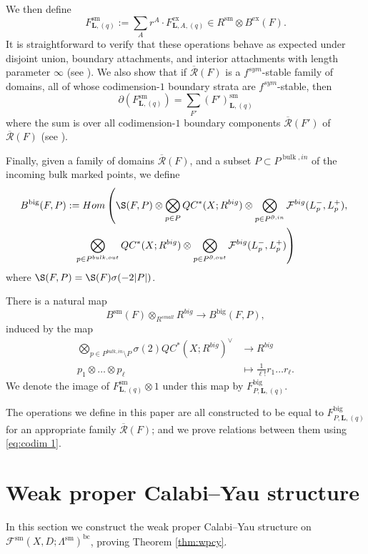 \documentclass{article}
\def\fuk{\EuF}
\def\bc{\mathsf{bc}}
\def\nov{r}
\def\cF{\mathcal{F}}
\def\fuk{\mathcal{F}}
\def\bc{{\operatorname{bc}}}
\def\Rbar{\overline{\mathcal{R}}}
\def\big{{\operatorname{big}}}
\def\sm{{\operatorname{sm}}}
\def\bL{\mathbf{L}}
\def\ex{\mathrm{ex}}
\def\bulk{{\operatorname{bulk}}}
\def\novb{r}
\begin{document}
We then define
$$F^\sm_{\bL,(q)} := \sum_A \nov^A \cdot F^\ex_{\bL,A,(q)} \in R^\sm \otimes B^\ex(F).$$
It is straightforward to verify that these operations behave as expected under disjoint union, boundary attachments, and interior attachments with length parameter $\infty$ (see \cite[Lemmas 4.16, 4.17]{relfukii}).  
We also show that if $\Rbar(F)$ is a $f^{sym}$-stable family of domains, all of whose codimension-$1$ boundary strata are $f^{sym}$-stable, then 
\begin{equation}\label{eq:codim 1}\partial(F^\sm_{\bL,(q)}) = \sum_{F'} (F')^\sm_{\bL,(q)}
\end{equation}
where the sum is over all codimension-$1$ boundary components $\Rbar(F')$ of $\Rbar(F)$ (see \cite[Lemma 4.18]{relfukii}). 

Finally, given a family of domains $\Rbar(F)$, and a subset $P \subset P^{\bulk,in}$ of the incoming bulk marked points, we define 
\begin{multline}
B^\big(F,P) := Hom\left(\S(F,P) \otimes \bigotimes_{p \in P} QC^*(X;R^{big}) \otimes \bigotimes_{p \in P^{\partial,in}} \cF^{big}(L_p^-,L_p^+) ,\right.\\
\left.\bigotimes_{p \in P^{bulk,out}} QC^*(X;R^{big}) \otimes  \bigotimes_{p \in P^{\partial,out}} \cF^{big}(L_p^-,L_p^+)\right)
 \end{multline}
 where $\S(F,P) = \S(F)\sigma(-2|P|)$. 
 
There is a natural map
$$B^\sm(F) \otimes_{R^{small}} R^{big} \to B^\big(F,P),$$
induced by the map
\begin{align*}
    \bigotimes_{p \in P^{bulk,in} \setminus P} \sigma(2)QC^*(X;R^{big})^\vee & \to R^{big} \\
    p_1 \otimes \ldots \otimes p_\ell &\mapsto \frac{1}{\ell!} \novb_1 \ldots \novb_\ell.
\end{align*}
We denote the image of $F^\sm_{\bL,(q)} \otimes 1$ under this map by $F^\big_{P,\bL,(q)}$. 

The operations we define in this paper are all constructed to be equal to $F^\big_{P,\bL,(q)}$ for an appropriate family $\Rbar(F)$; and we prove relations between them using \eqref{eq:codim 1}.

\section{Weak proper Calabi--Yau structure}\label{sec:wpcy}

In this section we construct the weak proper Calabi--Yau structure on $\fuk^\sm(X,D;\Lambda^\sm)^\bc$, proving Theorem \ref{thm:wpcy}. 
\end{document}
